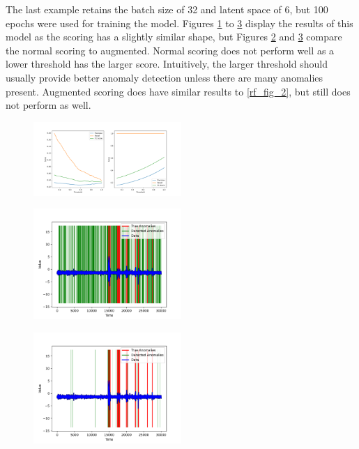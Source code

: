 \documentclass[conference]{IEEEtran}
\begin{document}
The last example retains the batch size of 32 and latent space of 6, but 100 epochs were used for training the model. Figures \ref{rf_fig_5} to \ref{rf_fig_7} display the results of this model as the scoring has a slightly similar shape, but Figures \ref{rf_fig_6} and \ref{rf_fig_7} compare the normal scoring to augmented. Normal scoring does not perform well as a lower threshold has the larger score. Intuitively, the larger threshold should usually provide better anomaly detection unless there are many anomalies present. Augmented scoring does have similar results to \ref{rf_fig_2}, but still does not perform as well.

\begin{figure}[htbp]
    \centering
    \includegraphics[width=0.5\textwidth]{rf_fig_5.png}
    \caption{}
    \label{rf_fig_5}
\end{figure}

\begin{figure}[htbp]
    \centering
    \includegraphics[width=0.5\textwidth]{rf_fig_6.png}
    \caption{}
    \label{rf_fig_6}
\end{figure}

\begin{figure}[htbp]
    \centering
    \includegraphics[width=0.5\textwidth]{rf_fig_7.png}
    \caption{}
    \label{rf_fig_7}
\end{figure}
\end{document}

